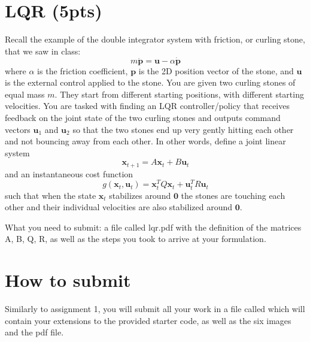 \documentclass[11pt, a4paper]{article}
\begin{document}
\section{LQR (5pts)}
Recall the example of the double integrator system with friction, or curling stone, that we saw in class:
\begin{equation}
m\ddot{\textbf{p}} = \textbf{u}-\alpha \dot{\textbf{p}} \nonumber
\end{equation}
\noindent where $\alpha$ is the friction coefficient, $\textbf{p}$ is the 2D position vector of the stone, and $\textbf{u}$ is the external control applied to the stone. 
You are given two curling stones of equal mass $m$. They start from different starting positions, with different starting velocities. You are tasked with finding an LQR 
controller/policy that receives feedback on the joint state of the two curling stones and outputs command vectors $\textbf{u}_1$ and $\textbf{u}_2$ so that the two stones 
end up very gently hitting each other and not bouncing away from each other. In other words, define a joint linear system 
\begin{equation}
  \textbf{x}_{t+1} = A\textbf{x}_t + B\textbf{u}_t
\end{equation}
\noindent and an instantaneous cost function
\begin{equation}
  g(\textbf{x}_t, \textbf{u}_t) = \textbf{x}^T_tQ\textbf{x}_t + \textbf{u}^T_tR\textbf{u}_t
\end{equation}
\noindent such that when the state $\textbf{x}_t$ stabilizes around $\textbf{0}$ the stones are touching each other and their individual velocities are also 
stabilized around $\textbf{0}$.

What you need to submit: a file called lqr.pdf with the definition of the matrices A, B, Q, R, as well as the steps you took to arrive at your formulation.    

\section{How to submit}
Similarly to assignment 1, you will submit all your work in a file called  which will contain
your extensions to the provided starter code, as well as the six images and the pdf file. 


\end{document}
